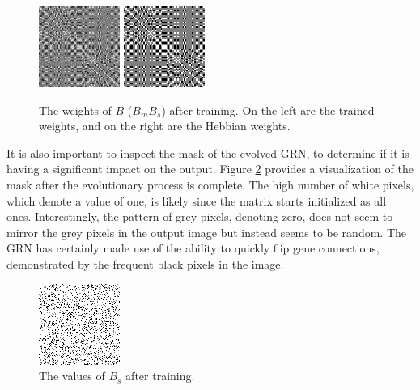 \documentclass[twocolumn,a4paper,11pt]{article}
\begin{document}
    \begin{figure}[h]
        \centering
        \includegraphics[width=0.45\linewidth]{ex-img/masked_weights.png}
        \includegraphics[width=0.45\linewidth]{ex-img/hebb_weights.png}
        \caption{The weights of $B$ ($B_mB_s$) after training. On the left are the trained weights, and on the right are the Hebbian weights.} \label{fig:ex-weights}
    \end{figure}

    It is also important to inspect the mask of the evolved GRN, to determine if it is having a significant impact on the output. Figure \ref{fig:ex-mask} provides a visualization of the mask after the evolutionary process is complete. The high number of white pixels, which denote a value of one, is likely since the matrix starts initialized as all ones. Interestingly, the pattern of grey pixels, denoting zero, does not seem to mirror the grey pixels in the output image but instead seems to be random. The GRN has certainly made use of the ability to quickly flip gene connections, demonstrated by the frequent black pixels in the image.

    \begin{figure}[h]
        \centering
        \includegraphics[width=0.45\linewidth]{ex-img/masked_mask.png}
        \caption{The values of $B_s$ after training.} \label{fig:ex-mask}
    \end{figure}
\end{document}

